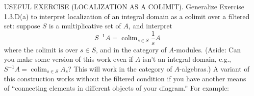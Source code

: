 USEFUL EXERCISE (LOCALIZATION AS A COLIMIT). Generalize Exercise 1.3.D(a) to interpret localization of an integral domain as a colimit over a filtered set: suppose $S$ is a multiplicative set of $A$, and interpret
$$S^{-1}A=\operatorname{colim}_{s\in S}\frac{1}{s}A$$
where the colimit is over $s\in S$, and in the category of $A$-modules. (Aside: Can you make some version of this work even if $A$ isn’t an integral domain, e.g., $S^{-1}A=\operatorname{colim}_{s\in S}A_s$? This will work in the category of $A$-algebras.) A variant of this construction works without the filtered condition if you have another means of “connecting elements in different objects of your diagram.” For example:
